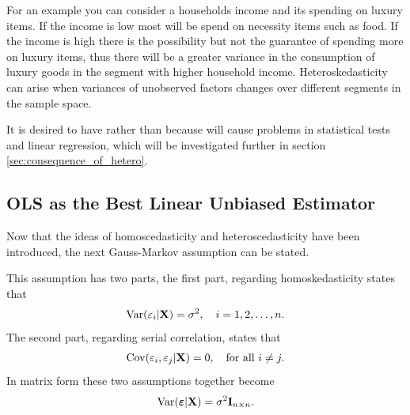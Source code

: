 For an example you can consider a households income and its spending on luxury items. If the income is low most will be spend on necessity items such as food. If the income is high there is the possibility but not the guarantee of spending more on luxury items, thus there will be a greater variance in the consumption of luxury goods in the segment with higher household income. Heteroskedasticity can arise when variances of unobserved factors changes over different segments in the sample space. 

It is desired to have \homo rather than \hetero because \hetero will cause problems in statistical tests and linear regression, which will be investigated further in section \ref{sec:consequence_of_hetero}. 

\subsection{OLS as the Best Linear Unbiased Estimator}
Now that the ideas of homoscedasticity and heteroscedasticity have been introduced, the next Gauss-Markov assumption can be stated.
\begin{assumption}\label{as:homoskedasticity_and_no_serial_correlation}
    This assumption has two parts, the first part, regarding homoskedasticity states that
    \begin{align*}
       \operatorname{\text{Var}}(\varepsilon_i | \mathbf{X}) = \sigma^2, \quad i = 1,2, \ldots, n.
    \end{align*}
    The second part, regarding serial correlation, states that
    \begin{align*}
        \operatorname{\text{Cov}}(\varepsilon_i, \varepsilon_j | \mathbf{X}) = 0, \quad \text{for all} \ i \neq j.
    \end{align*}
    In matrix form these two assumptions together become
    \begin{align*}
        \operatorname{\text{Var}}(\boldsymbol{\varepsilon} | \mathbf{X}) = \sigma^2\mathbf{I}_{n\times n}.
    \end{align*}
\end{assumption}


